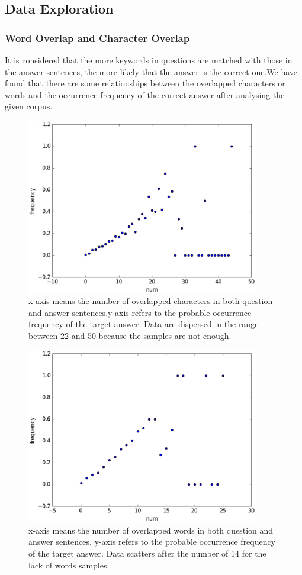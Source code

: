 \documentclass{llncs}
\begin{document}
\subsection{Data Exploration}
\label{sec:exploration}
\subsubsection{Word Overlap and Character Overlap}
It is considered that the more keywords in questions are matched with those in the answer sentences, the more likely that the answer is the correct one.We have found that there are some relationships between the overlapped characters or words and the occurrence frequency of the correct answer after analysing the given corpus.


\begin{figure}[htb]
\centering
\includegraphics[width=4in]{figures/character_overlap.eps}
\caption{x-axis means the number of overlapped characters in both question and answer sentences.y-axis refers to the probable occurrence frequency of the target answer. Data are dispersed in the range between 22 and 50 because the samples are not enough.}
\label{fig:character_overlap}
\end{figure}


\begin{figure}
\centering
\includegraphics[width=4in]{figures/word_overlap.eps}
\caption{x-axis means the number of overlapped words in both question and answer sentences. y-axis refers to the probable occurrence frequency of the target answer. Data scatters after the number of 14 for the lack of words samples.}
\label{fig:word_overlap}
\end{figure}
\end{document}
